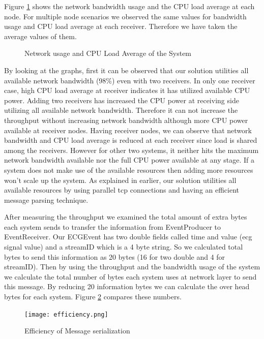 Figure \ref{networkandload} shows the network bandwidth usage and the CPU load average at each node. For multiple node scenarios we observed the same values for bandwidth usage and CPU load average at each receiver. Therefore we have taken the average values of them. 

\begin{figure}[!t]
	\centering
	\hfil
	\caption{Network usage and CPU Load Average of the System}
	\label{networkandload}
\end{figure}
 

By looking at the graphs, first it can be observed that our solution utilities all available network bandwidth (98\%) even with two receivers. In only one receiver case, high CPU load average at receiver indicates it has utilized available CPU power. Adding two receivers has increased the CPU power at receiving side utilizing all available network bandwidth. Therefore it can not increase the throughput without increasing network bandwidth although more CPU power available at receiver nodes. Having receiver nodes, we can observe that network bandwidth and CPU load average is reduced at each receiver since load is shared among the receivers. However for other two systems, it neither hits the maximum network bandwidth available nor the full CPU power available at any stage. If a system does not make use of the available resources then adding more resources won't scale up the system. As explained in earlier, our solution utilities all available resources by using parallel tcp connections and having an efficient 
message parsing technique.

After measuring the throughput we examined the  total amount of extra bytes each system sends to transfer the information from EventProducer to EventReceiver. Our ECGEvent has two double fields called time and value (ecg signal value) and a streamID which is a 4 byte string. So we calculated total bytes to send this information as 20 bytes (16 for two double and 4 for streamID). Then by using the throughput and the bandwidth usage of the system we calculate the total number of bytes each system uses at network layer to send this message. By reducing 20 information bytes we can calculate the over head bytes for each system. Figure \ref{efficiency} compares these numbers.

\begin{figure}[!t]
        \centering
        \texttt{[image: efficiency.png]}

        \caption{Efficiency of Message serialization}
        \label{efficiency}
\end{figure}

